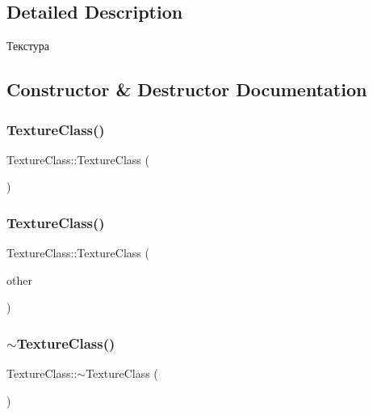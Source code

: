 \subsection{Detailed Description}
Текстура 

\subsection{Constructor \& Destructor Documentation}
\mbox{\label{class_texture_class_a3ef8a8e22f2319b20f45f78b8b37f496}} 
\subsubsection{\texorpdfstring{Texture\+Class()}{TextureClass()}\hspace{0.1cm}{\footnotesize\ttfamily [1/2]}}
{\footnotesize\ttfamily Texture\+Class\+::\+Texture\+Class (\begin{DoxyParamCaption}{ }\end{DoxyParamCaption})}

\mbox{\label{class_texture_class_ae1a2a78cd218da2e31eb7754984c10a2}} 
\subsubsection{\texorpdfstring{Texture\+Class()}{TextureClass()}\hspace{0.1cm}{\footnotesize\ttfamily [2/2]}}
{\footnotesize\ttfamily Texture\+Class\+::\+Texture\+Class (\begin{DoxyParamCaption}\item[{const \hyperlink{class_texture_class}{Texture\+Class} \&}]{other }\end{DoxyParamCaption})}

\mbox{\label{class_texture_class_a990ce1e7783727cde9cb4a88a4281b08}} 
\subsubsection{\texorpdfstring{$\sim$\+Texture\+Class()}{~TextureClass()}}
{\footnotesize\ttfamily Texture\+Class\+::$\sim$\+Texture\+Class (\begin{DoxyParamCaption}{ }\end{DoxyParamCaption})}



